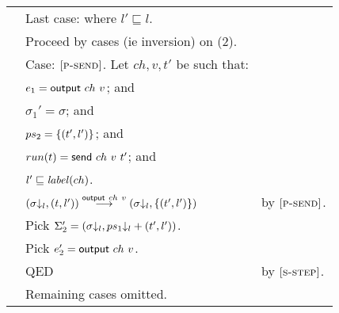 \begin{tabular}{l@{$\qquad$}l@{$\qquad$}l}
        & Last case: where $l'\sqsubseteq l$.
\\
        & Proceed by cases (ie inversion) on (2).
\\
        & Case: $\rn{p-send}$. Let $ch,v,t'$ be such that:
\\
        & \z $e_1=\evsend{ch}{v}$; and
\\
        & \z $\sigma_1'=\sigma$; and
\\
        & \z $ps_2=\{\process{t'}{l'}\}$; and
\\
        & \z $run(t)=\opsend{ch}{v}{t'}$; and
\\
        & \z $l'\sqsubseteq\s{label}(ch)$.
\\
        & \z $\tstep{\evsend{ch}{v}}{(\proj{\sigma}{l},\process{t}{l'})}{(\proj{\sigma}{l},\{\process{t'}{l'}\})}$
        & by $\rn{p-send}$.
\\
        & \z Pick $\Sigma_2' = {(\proj{\sigma}{l},\proj{ps_1}{l}+\process{t'}{l'})}$.
\\
        & \z Pick $e_2' = {\evsend{ch}{v}}$.
\\
        & \z QED
        & by $\rn{s-step}$.
\\
        & Remaining cases omitted.
\end{tabular}


